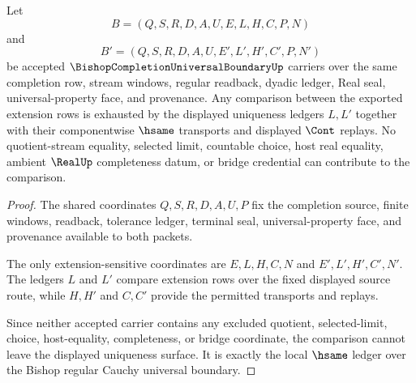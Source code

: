 \begin{theorem}
\label{thm:bishop-completion-universal-uniqueness-ledger}
Let
$$
B=(Q,S,R,D,A,U,E,L,H,C,P,N)
$$
and
$$
B'=(Q,S,R,D,A,U,E',L',H',C',P,N')
$$
be accepted $\BishopCompletionUniversalBoundaryUp$ carriers over the same completion row, stream windows, regular readback, dyadic ledger, Real seal, universal-property face, and provenance. Any comparison between the exported extension rows is exhausted by the displayed uniqueness ledgers $L,L'$ together with their componentwise $\hsame$ transports and displayed $\Cont$ replays. No quotient-stream equality, selected limit, countable choice, host real equality, ambient $\RealUp$ completeness datum, or bridge credential can contribute to the comparison.
\end{theorem}
\begin{proof}
The shared coordinates $Q,S,R,D,A,U,P$ fix the completion source, finite windows, readback, tolerance ledger, terminal seal, universal-property face, and provenance available to both packets.

The only extension-sensitive coordinates are $E,L,H,C,N$ and $E',L',H',C',N'$. The ledgers $L$ and $L'$ compare extension rows over the fixed displayed source route, while $H,H'$ and $C,C'$ provide the permitted transports and replays.

Since neither accepted carrier contains any excluded quotient, selected-limit, choice, host-equality, completeness, or bridge coordinate, the comparison cannot leave the displayed uniqueness surface. It is exactly the local $\hsame$ ledger over the Bishop regular Cauchy universal boundary.
\end{proof}

